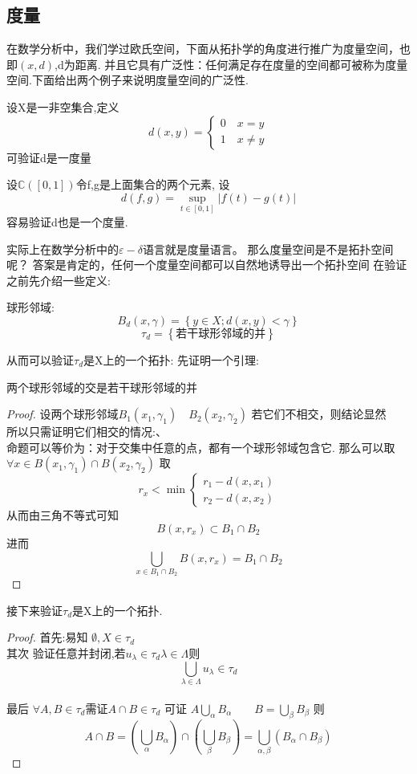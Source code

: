 \subsection*{度量}
在数学分析中，我们学过欧氏空间，下面从拓扑学的角度进行推广为度量空间，也即\(\left(x,d\right)\),d为距离.
并且它具有广泛性：任何满足存在度量的空间都可被称为度量空间.下面给出两个例子来说明度量空间的广泛性.
\begin{example}
    设X是一非空集合,定义\[
        d(x,y)=
        \begin{cases}
            0 \quad x=y \\
            1 \quad x\neq y 
        \end{cases}\]
        可验证d是一度量
\end{example}
\begin{example}
    设\(\mathbb{C}\left(\left[0,1\right]\right)\)令f,g是上面集合的两个元素,
    设\[
    d(f,g)=\sup\limits_{t\in \left[0,1\right]} |f(t)-g(t)|    
    \]
容易验证d也是一个度量.
\end{example}
实际上在数学分析中的\(\varepsilon-\delta\)语言就是度量语言。
那么度量空间是不是拓扑空间呢？
答案是肯定的，任何一个度量空间都可以自然地诱导出一个拓扑空间
在验证之前先介绍一些定义:
\begin{definition}
    球形邻域: \[B_d(x,\gamma)=\left\{y\in X ; d(x,y)<\gamma \right\}\]
    \[\tau_d=\left\{\text{若干球形邻域的并}\right\}\]
\end{definition}    
从而可以验证\(\tau_d\)是X上的一个拓扑:
先证明一个引理:
\begin{lemma}
    两个球形邻域的交是若干球形邻域的并
\end{lemma}
\begin{proof}
    设两个球形邻域\(B_1\left(x_1,\gamma_1\right) \quad B_2\left(x_2,\gamma_2\right)\)
    若它们不相交，则结论显然
    \\
    所以只需证明它们相交的情况:、
    \\
    命题可以等价为：对于交集中任意的点，都有一个球形邻域包含它.
    那么可以取\(\forall x \in B\left(x_1,{\gamma}_1\right) \cap B\left(x_2,{\gamma}_2\right)\)
    取\[r_x<\min
    \begin{cases}
        r_1 -d(x,x_1) \\
        r_2 -d(x,x_2)
    \end{cases}\]
    从而由三角不等式可知 \[B\left(x,r_x\right) \subset B_1\cap B_2\]
    进而\[\bigcup_{x\in B_1\cap B_2}B(x,r_x)=B_1 \cap B_2\]
\end{proof}
接下来验证\({\tau}_d\)是X上的一个拓扑.
\begin{proof}
    首先:易知 \(\emptyset , X \in \tau_d\)\\
    其次 验证任意并封闭,若\(u_{\lambda} \in \tau_d \lambda \in \Lambda\)则
    \[\bigcup_{\lambda \in \Lambda} u_{\lambda} \in \tau_d\] \\
    最后 \(\forall  A,B \in \tau_d \)需证\(A\cap B \in \tau_d\)
    可证 \(A \bigcup_{\alpha}B_{\alpha} \qquad B=\bigcup_{\beta}B_{\beta}\)
    则\[A\cap B=\left(\bigcup_{\alpha}B_{\alpha}\right)\cap \left(\bigcup_{\beta}B_{\beta}\right)=\bigcup_{\alpha,\beta} \left(B_{\alpha}\cap B_{\beta}\right)\]
\end{proof}
